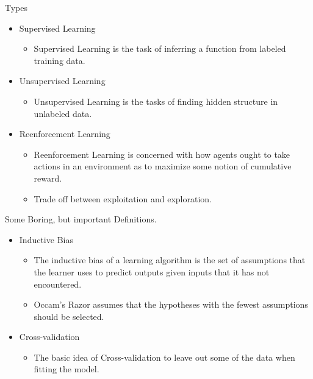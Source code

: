 \begin{frame}{Types}

\begin{itemize}
\itemsep1pt\parskip0pt
\item
  Supervised Learning

  \begin{itemize}
  \itemsep1pt\parskip0pt
  \item
    Supervised Learning is the task of inferring a function from labeled
    training data.
  \end{itemize}
\item
  Unsupervised Learning

  \begin{itemize}
  \itemsep1pt\parskip0pt
  \item
    Unsupervised Learning is the tasks of finding hidden structure in
    unlabeled data.
  \end{itemize}
\item
  Reenforcement Learning

  \begin{itemize}
  \itemsep1pt\parskip0pt
  \item
    Reenforcement Learning is concerned with how agents ought to take
    actions in an environment as to maximize some notion of cumulative
    reward.
  \item
    Trade off between exploitation and exploration.
  \end{itemize}
\end{itemize}

\end{frame}

\begin{frame}{Some Boring, but important Definitions.}

\begin{itemize}
\itemsep1pt\parskip0pt
\item
  Inductive Bias

  \begin{itemize}
  \itemsep1pt\parskip0pt
  \item
    The inductive bias of a learning algorithm is the set of assumptions
    that the learner uses to predict outputs given inputs that it has
    not encountered.
  \item
    Occam's Razor assumes that the hypotheses with the fewest
    assumptions should be selected.
  \end{itemize}
\item
  Cross-validation

  \begin{itemize}
  \itemsep1pt\parskip0pt
  \item
    The basic idea of Cross-validation to leave out some of the data
    when fitting the model.
  \end{itemize}
\end{itemize}

\end{frame}

